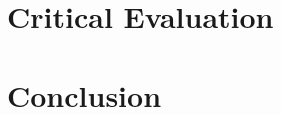 \documentclass[ %
                    author={Tom Jager},
                supervisor={Dr. Daniel Schien},
                    degree={MEng},
                     title={A Bayesian Inference Engine for UMIS Structured Data},
                  subtitle={},
                      type={research},
                      year={2019} ]{dissertation}
\begin{document}
\chapter{Critical Evaluation}
\label{chap:evaluation}

\chapter{Conclusion}
\label{chap:conclusion}
\end{document}
